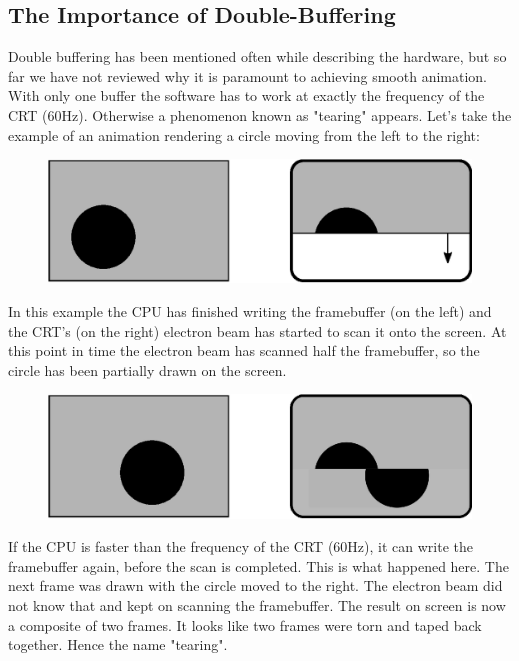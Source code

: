 \documentclass[book.tex]{subfiles}
\begin{document}
\subsection{The Importance of Double-Buffering}
Double buffering has been mentioned often while describing the hardware, but so far we have not reviewed why it is paramount to achieving smooth animation. With only one buffer the software has to work at exactly the frequency of the CRT (60Hz). Otherwise a phenomenon known as "tearing" appears. Let's take the example of an animation rendering a circle moving from the left to the right:
\par
\begin{figure}[H]
\centering
\includegraphics[width=\textwidth]{imgs/drawings/doublebuffer_before.eps}
\end{figure}
\par
In this example the CPU has finished writing the framebuffer (on the left) and the CRT's (on the right) electron beam has started to scan it onto the screen. At this point in time the electron beam has scanned half the framebuffer, so the circle has been partially drawn on the screen.
\par
\begin{figure}[H]
\centering
\includegraphics[width=\textwidth]{imgs/drawings/doublebuffer_after.eps}
\end{figure}
\par
If the CPU is faster than the frequency of the CRT (60Hz), it can write the framebuffer again, before the scan is completed. This is what happened here. The next frame was drawn with the circle moved to the right. The electron beam did not know that and kept on scanning the framebuffer. The result on screen is now a composite of two frames. It looks like two frames were torn and taped back together. Hence the name "tearing".\\
\end{document}
